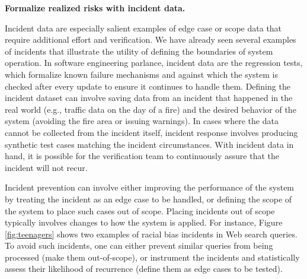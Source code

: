 \textbf{Formalize realized risks with incident data.}

Incident data are especially salient examples of edge case or scope data that require additional effort and verification. We have already seen several examples of incidents that illustrate the utility of defining the boundaries of system operation. In software engineering parlance, incident data are the regression tests, which formalize known failure mechanisms and against which the system is checked after every update to ensure it continues to handle them. Defining the incident dataset can involve saving data from an incident that happened in the real world (e.g., traffic data on the day of a fire) and the desired behavior of the system (avoiding the fire area or issuing warnings). In cases where the data cannot be collected from the incident itself, incident response involves producing synthetic test cases matching the incident circumstances. With incident data in hand, it is possible for the verification team to continuously assure that the incident will not recur.

Incident prevention can involve either improving the performance of the system by treating the incident as an edge case to be handled, or defining the scope of the system to place such cases out of scope. Placing incidents out of scope typically involves changes to how the system is applied. For instance, Figure \ref{fig:teenagers} shows two examples of racial bias incidents in Web search queries. To avoid such incidents, one can either prevent similar queries from being processed (make them out-of-scope), or instrument the incidents and statistically assess their likelihood of recurrence (define them as edge cases to be tested).

